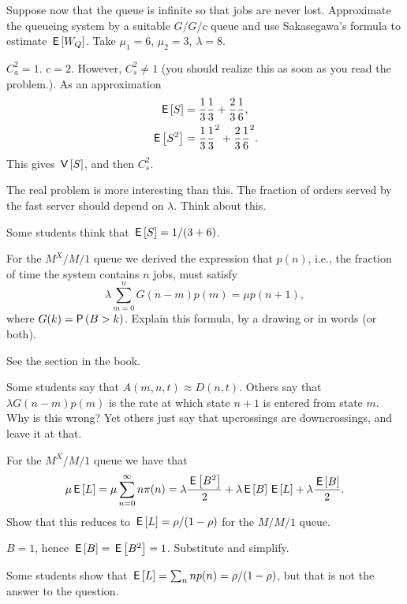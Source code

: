 \begin{exercise}[201904]
  Suppose now that the queue is infinite so that jobs are never lost.
  Approximate the queueing system by a suitable $G/G/c$ queue and use Sakasegawa's formula to estimate $\,\mathsf{E}\left[W_Q\right]$.
  Take $\mu_1=6$, $\mu_2=3$, $\lambda=8$.
\begin{solution}
  $C_a^2=1$. $c=2$. However, $C_s^2\neq 1$ (you should realize this as soon as you read the problem.). As an approximation
  \begin{align*}
  \,\mathsf{E}\left[S\right] &= \frac 1 3 \frac 1 3 + \frac 2 3 \frac 1 6, \\
  \,\mathsf{E}\left[S^2\right] &= \frac 1 3 \frac 1 3^2 + \frac 2 3 \frac 1 6^2.
  \end{align*}
  This gives $\,\mathsf{V}\left[S\right]$, and then $C_s^2$.

  The real problem is more interesting than this.
  The fraction of orders served by the fast server should depend on $\lambda$.
  Think about this.

  Some students think that $\,\mathsf{E}\left[S\right] = 1/(3+6)$. 
\end{solution}
\end{exercise}



\begin{exercise}[201904]
  For the $M^X/M/1$ queue  we derived the expression that $p(n)$, i.e., the fraction of time the system contains $n$ jobs, must satisfy
  \begin{equation}
  \lambda \sum_{m=0}^n G(n-m) p(m) = \mu p(n+1),  
  \end{equation}
  where $G(k) = \P{B>k}$.
  Explain this formula, by a drawing or in words (or both).

\begin{solution}
    See the section in the book.

    Some students say that $A(m,n,t) \approx D(n,t)$. Others say that $\lambda G(n-m)p(m)$ is the rate at which state $n+1$ is entered from state $m$. Why is this wrong?  Yet others just say that upcrossings are downcrossings, and leave it at that. 
\end{solution}

\end{exercise}



\begin{exercise}[201904]
For the $M^X/M/1$ queue we have that
\begin{equation}
  \mu \,\mathsf{E}\left[L\right] =\mu \sum_{n=0}^\infty n \pi(n) = \lambda \frac{\,\mathsf{E}\left[B^2\right]}2  + \lambda \,\mathsf{E}\left[B\right] \,\mathsf{E}\left[L\right] +\lambda \frac{\,\mathsf{E}\left[B\right]}2.
\end{equation}
Show that this reduces to $\,\mathsf{E}\left[L\right] = \rho/(1-\rho)$ for the $M/M/1$ queue.
\begin{solution}
  $B=1$, hence  $\,\mathsf{E}\left[B\right] = \,\mathsf{E}\left[B^2\right] = 1$. Substitute and simplify.

  Some students show that $\,\mathsf{E}\left[L\right] = \sum_n np(n)=\rho/(1-\rho)$, but that is not the answer to the question.
\end{solution}
\end{exercise}


